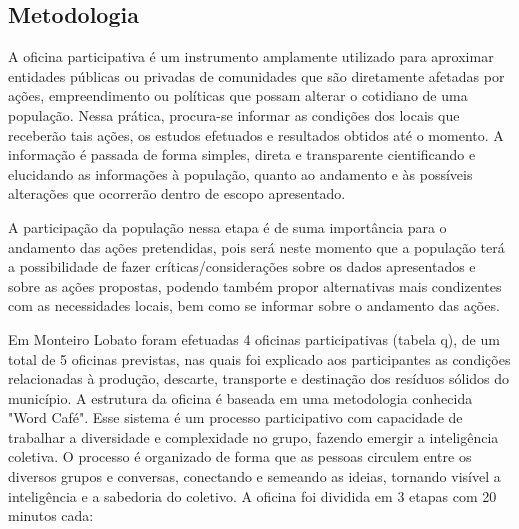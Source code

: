 \subsection{Metodologia}

A oficina participativa é um instrumento amplamente utilizado para aproximar entidades públicas ou privadas de comunidades que são diretamente afetadas por ações, empreendimento ou políticas que possam alterar o cotidiano de uma população. Nessa prática, procura-se informar as condições dos locais que receberão tais ações, os estudos efetuados e resultados obtidos até o momento. A informação é passada de forma simples, direta e transparente cientificando e elucidando as informações à população, quanto ao andamento e às possíveis alterações que ocorrerão dentro de escopo apresentado.

A participação da população nessa etapa é de suma importância para o andamento das ações pretendidas, pois será neste momento que a população terá a possibilidade de fazer críticas/considerações sobre os dados apresentados e sobre as ações propostas, podendo também propor alternativas mais condizentes com as necessidades locais, bem como se informar sobre o andamento das ações.

Em Monteiro Lobato foram efetuadas 4 oficinas participativas (tabela q), de um total de 5 oficinas previstas, nas quais foi explicado aos participantes as condições relacionadas à produção, descarte, transporte e destinação dos resíduos sólidos do município. A estrutura da oficina é baseada em uma metodologia conhecida "Word Café". Esse sistema é um processo participativo com capacidade de trabalhar a diversidade e complexidade no grupo, fazendo emergir a inteligência coletiva. O processo é organizado de forma que as pessoas circulem entre os diversos grupos e conversas, conectando e semeando as ideias, tornando visível a inteligência e a sabedoria do coletivo. A oficina foi dividida em 3 etapas com 20 minutos cada: 


